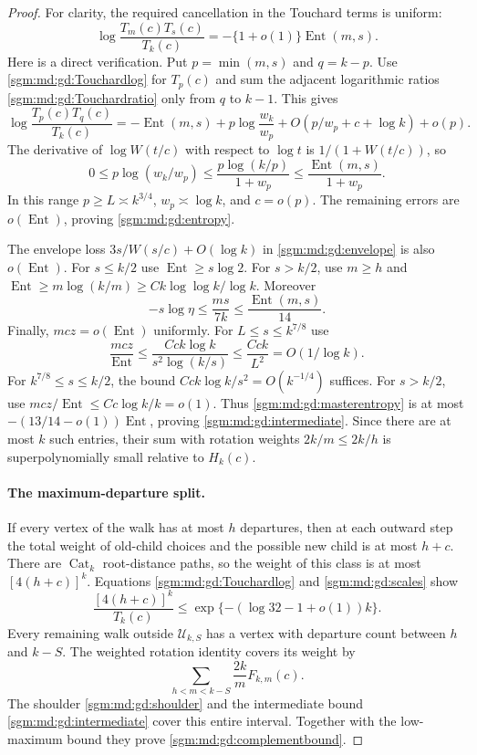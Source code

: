 \documentclass[11pt,letterpaper]{article}
\theoremstyle{remark}\newtheorem{remark}[theorem]{Remark}
\newcommand{\Cat}{\operatorname{Cat}}\newcommand{\E}{\mathbb E}\newcommand{\Prob}{\mathbb P}\newcommand{\ind}{\mathbf 1}
\theoremstyle{definition}\newtheorem{definition}[theorem]{Definition}
\begin{document}
\begin{proof}
For clarity, the required cancellation in the Touchard terms is
uniform:
\begin{equation}\label{sgm:md:gd:entropy}
 \log\frac{T_m(c)T_s(c)}{T_k(c)}
 =-\{1+o(1)\}\operatorname{Ent}(m,s).
\end{equation}
Here is a direct verification.  Put $p=\min(m,s)$ and $q=k-p$.
Use \eqref{sgm:md:gd:Touchardlog} for $T_p(c)$ and sum the adjacent logarithmic
ratios \eqref{sgm:md:gd:Touchardratio} only from $q$ to $k-1$.  This gives
\[
 \log\frac{T_p(c)T_q(c)}{T_k(c)}
 =-\operatorname{Ent}(m,s)
   +p\log\frac{w_k}{w_p}+O(p/w_p+c+\log k)+o(p).
\]
The derivative of $\log W(t/c)$ with respect to $\log t$ is
$1/(1+W(t/c))$, so
\[
 0\le p\log(w_k/w_p)
 \le \frac{p\log(k/p)}{1+w_p}
 \le\frac{\operatorname{Ent}(m,s)}{1+w_p}.
\]
In this range $p\ge L\asymp k^{3/4}$, $w_p\asymp\log k$, and
$c=o(p)$.  The remaining errors are $o(\operatorname{Ent})$,
proving \eqref{sgm:md:gd:entropy}.

The envelope loss $3s/W(s/c)+O(\log k)$ in
\eqref{sgm:md:gd:envelope} is also $o(\operatorname{Ent})$.
For $s\le k/2$ use $\operatorname{Ent}\ge s\log2$.
For $s>k/2$, use $m\ge h$ and
$\operatorname{Ent}\ge m\log(k/m)
 \ge C k\log\log k/\log k$.
Moreover
\[
 -s\log\eta\le\frac{ms}{7k}
 \le\frac{\operatorname{Ent}(m,s)}{14}.
\]
Finally, $mc z=o(\operatorname{Ent})$ uniformly.
For $L\le s\le k^{7/8}$ use
\[
 \frac{mc z}{\operatorname{Ent}}
 \le\frac{Cck\log k}{s^2\log(k/s)}
 \le\frac{Cck}{L^2}=O(1/\log k).
\]
For $k^{7/8}\le s\le k/2$, the bound
$Cck\log k/s^2=O(k^{-1/4})$ suffices.  For $s>k/2$, use
$mc z/\operatorname{Ent}\le Cc\log k/k=o(1)$.
Thus \eqref{sgm:md:gd:masterentropy} is at most
$-(13/14-o(1))\operatorname{Ent}$, proving
\eqref{sgm:md:gd:intermediate}.  Since there are at most $k$ such entries,
their sum with rotation weights $2k/m\le2k/h$ is superpolynomially
small relative to $H_k(c)$.

\paragraph{The maximum-departure split.}
If every vertex of the walk has at most $h$ departures, then at each
outward step the total weight of old-child choices and the possible
new child is at most $h+c$.  There are $\Cat_k$ root-distance paths,
so the weight of this class is at most $[4(h+c)]^k$.
Equations \eqref{sgm:md:gd:Touchardlog} and \eqref{sgm:md:gd:scales} show
\[
 \frac{[4(h+c)]^k}{T_k(c)}
 \le \exp\{-(\log32-1+o(1))k\}.
\]
Every remaining walk outside $\mathcal U_{k,S}$ has a vertex with
departure count between $h$ and $k-S$.  The weighted rotation identity
covers its weight by
\[
 \sum_{h<m<k-S}\frac{2k}{m}F_{k,m}(c).
\]
The shoulder \eqref{sgm:md:gd:shoulder} and the intermediate bound
\eqref{sgm:md:gd:intermediate} cover this entire interval.  Together with
the low-maximum bound they prove \eqref{sgm:md:gd:complementbound}.
\end{proof}
\end{document}
